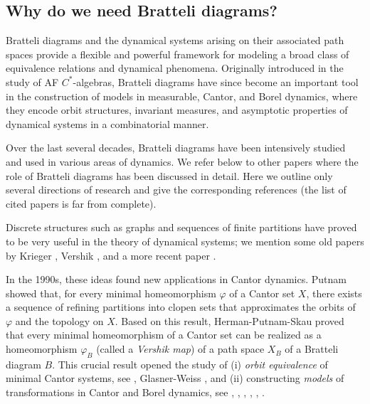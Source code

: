 \documentclass[11pt,reqno]{amsart}
\theoremstyle{definition}
\theoremstyle{remark}
\theoremstyle{plain}
\numberwithin{equation}{section}
\begin{document}
\subsection{Why do we need Bratteli diagrams?}
Bratteli diagrams and the dynamical systems arising on their associated path spaces provide a flexible and powerful framework for modeling a broad class of equivalence relations and dynamical phenomena. Originally introduced in the study of AF $C^*$-algebras, Bratteli diagrams have since become an important tool in the construction of models in measurable, Cantor, and Borel dynamics, where they encode orbit structures, invariant measures, and asymptotic properties of dynamical systems in a combinatorial manner. 

Over the last several decades, Bratteli diagrams have
been intensively studied and used in various areas of dynamics. 
We refer below to other papers where the role of Bratteli diagrams has been discussed in detail. Here we outline only several directions of research and give the corresponding references (the list of cited papers is far from complete). 

Discrete structures such as graphs and sequences of finite partitions have proved to be very useful in the theory of dynamical systems; we mention some old papers by Krieger \cite{Krieger1976}, Vershik \cite{ Vershik1973, Vershik_1981, Vershik_1982}, and a more recent paper \cite{GambaudoMartens2006}. 

In the 1990s, these ideas found new applications in Cantor dynamics. Putnam \cite{Putnam1989} 
showed that, for every minimal homeomorphism $\varphi$ 
of a Cantor set $X$, there exists a  sequence of refining partitions into clopen sets 
that approximates the orbits of $\varphi$ and the topology on
$X$. Based on this result, Herman-Putnam-Skau \cite{HermanPutnamSkau1992} proved that every minimal homeomorphism of a Cantor set can be realized as a
homeomorphism $\varphi_B$ (called a \textit{Vershik map}) 
of a path space $X_B$ of a Bratteli diagram $B$. This crucial result opened the study of (i) \textit{orbit equivalence} of minimal Cantor systems, see \cite{GiordanoPutnamSkau1995, GiordanoPutnamSkau1999}, Glasner-Weiss 
\cite{GlasnerWeiss_1995}, \cite{GiordanoMatuiPutnamSkau2010, GiordanoMatuiPutnamSkau2008} and (ii) constructing \textit{models} of transformations in Cantor and Borel dynamics, see \cite{Forrest1997}, \cite{Durand_Host_skau_1999}, \cite{BezuglyiDooleyKwiatkowski_2006}, 
 \cite{Medynets_2006}, \cite{DownarowiczKarpel_2019},
\cite{Shimomura2020}. 
\end{document}
